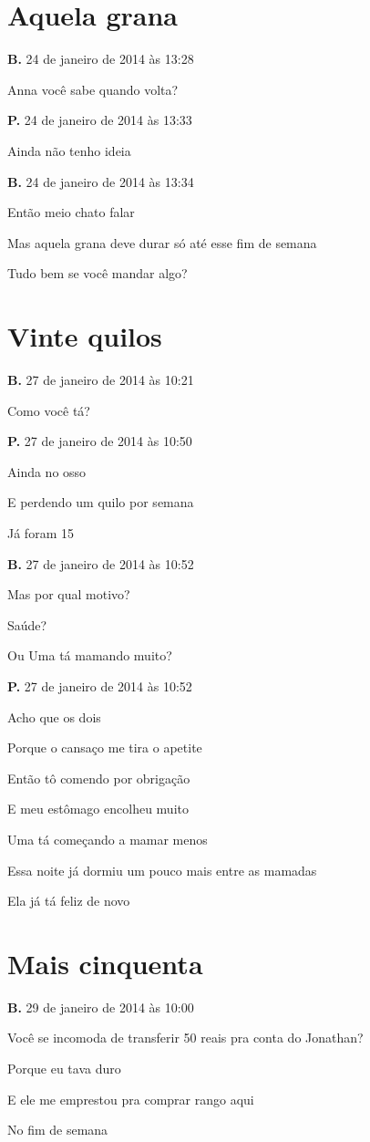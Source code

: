 \chapter{Aquela grana}

{\parindent0pt\parskip1pt\raggedright
\textbf{B.} 24 de janeiro de 2014 às 13:28

Anna você sabe quando volta?

\textbf{P.} 24 de janeiro de 2014 às 13:33

Ainda não tenho ideia

\textbf{B.} 24 de janeiro de 2014 às 13:34

Então meio chato falar

Mas aquela grana deve durar só até esse fim de semana

Tudo bem se você mandar algo?

\chapter{Vinte quilos}

\textbf{B.} 27 de janeiro de 2014 às 10:21

Como você tá?

\textbf{P.} 27 de janeiro de 2014 às 10:50

Ainda no osso

E perdendo um quilo por semana

Já foram 15

\textbf{B.} 27 de janeiro de 2014 às 10:52

Mas por qual motivo?

Saúde?

Ou Uma tá mamando muito?

\textbf{P.} 27 de janeiro de 2014 às 10:52

Acho que os dois

Porque o cansaço me tira o apetite

Então tô comendo por obrigação

E meu estômago encolheu muito

Uma tá começando a mamar menos

Essa noite já dormiu um pouco mais entre as mamadas

Ela já tá feliz de novo
}
\chapter{Mais cinquenta}

{\parindent0pt\parskip1pt\raggedright
\textbf{B.} 29 de janeiro de 2014 às 10:00

Você se incomoda de transferir 50 reais pra conta do Jonathan?

Porque eu tava duro

E ele me emprestou pra comprar rango aqui

No fim de semana
}


